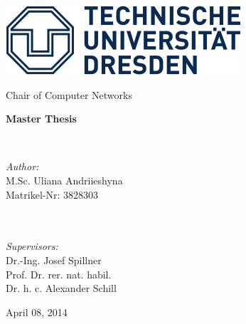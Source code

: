 \begin{titlepage}

\begin{center}

\begin{minipage}{0.30\textwidth}
	\begin{flushleft}
			\includegraphics[scale=0.45]{images/tud_logo}
	\end{flushleft}
\end{minipage}

\begin{bfseries}
	\large Chair of Computer Networks
\end{bfseries}

\vspace*{75mm}

{\LARGE \bf Master Thesis}\\[1 cm]

\begin{minipage}{0.8\textwidth}
	\begin{center}

		\\[3cm]
	\end{center}
\end{minipage}

\vspace{30mm}

\begin{minipage}{0.35\textwidth}
	\begin{flushleft} \large
		\emph{Author:}\\
		M.Sc. Uliana Andriieshyna\\
		Matrikel-Nr: 3828303\\
		~\\ ~\\
	\end{flushleft}
\end{minipage}
\begin{minipage}{0.60\textwidth}
	\begin{flushright} \large
		\emph{Supervisors:} \\
		Dr.-Ing. Josef Spillner\\
		Prof. Dr. rer. nat. habil.\\ Dr. h. c. Alexander Schill\\
		\end{flushright}
\end{minipage}

\vfill

April 08, 2014

\end{center}
\end{titlepage}